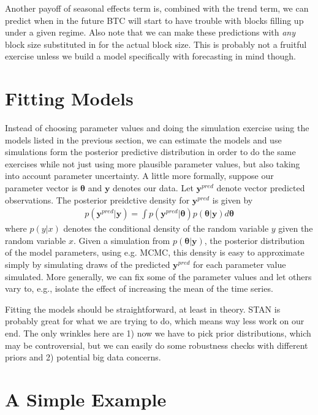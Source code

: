 \documentclass{article}
\begin{document}
Another payoff of seasonal effects term is, combined with the trend term, we can predict when in the future BTC will start to have trouble with blocks filling up under a given regime. Also note that we can make these predictions with {\it any} block size substituted in for the actual block size. This is probably not a fruitful exercise unless we build a model specifically with forecasting in mind though.

\section{Fitting Models}
Instead of choosing parameter values and doing the simulation exercise using the models listed in the previous section, we can estimate the models and use simulations form the posterior predictive distribution in order to do the same exercises while not just using more plausible parameter values, but also taking into account parameter uncertainty. A little more formally, suppose our parameter vector is $\bm{\theta}$ and $\bm{y}$ denotes our data. Let $\bm{y}^{pred}$ denote vector predicted observations. The posterior preidctive density for $\bm{y}^{pred}$ is given by
\begin{align*}
p(\bm{y}^{pred}|\bm{y}) = \int p(\bm{y}^{pred}|\bm{\theta})p(\bm{\theta}|\bm{y}) d\bm{\theta}
\end{align*}
where $p(y|x)$ denotes the conditional density of the random variable $y$ given the random variable $x$. Given a simulation from $p(\bm{\theta}|\bm{y})$, the posterior distribution of the model parameters, using e.g. MCMC, this density is easy to approximate simply by simulating draws of the predicted $\bm{y}^{pred}$ for each parameter value simulated. More generally, we can fix some of the parameter values and let others vary to, e.g., isolate the effect of increasing the mean of the time series. 

Fitting the models should be straightforward, at least in theory. STAN is probably great for what we are trying to do, which means way less work on our end. The only wrinkles here are 1) now we have to pick prior distributions, which may be controversial, but we can easily do some robustness checks with different priors and 2) potential big data concerns.

\section{A Simple Example}
\end{document}
